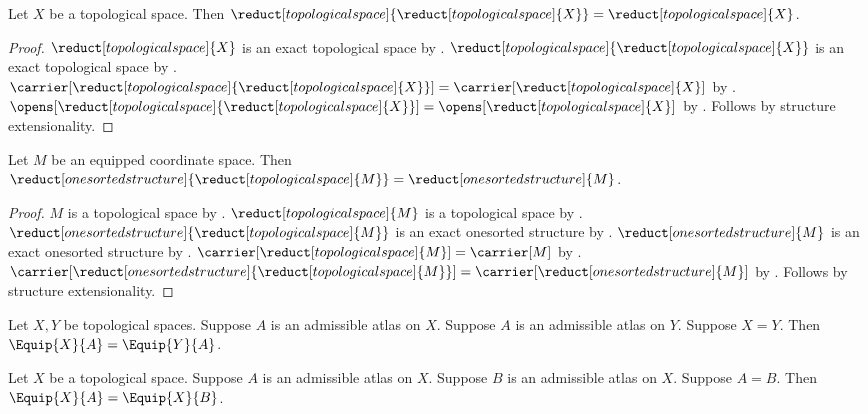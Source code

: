 \begin{proposition}\label{topological_reduct_idempotent}
    Let $X$ be a topological space.
    Then $\reduct[topological space]{\reduct[topological space]{X}}=\reduct[topological space]{X}$.
\end{proposition}
\begin{proof}
    $\reduct[topological space]{X}$ is an exact topological space
        by .
    $\reduct[topological space]{\reduct[topological space]{X}}$ is an exact topological space
        by .
    $\carrier[\reduct[topological space]{\reduct[topological space]{X}}]=
        \carrier[\reduct[topological space]{X}]$
        by .
    $\opens[\reduct[topological space]{\reduct[topological space]{X}}]=
        \opens[\reduct[topological space]{X}]$
        by .
    Follows by structure extensionality.
\end{proof}

\begin{proposition}\label{underlying_carrier_reduct_composition}
    Let $M$ be an equipped coordinate space.
    Then $\reduct[onesorted structure]{\reduct[topological space]{M}}=
        \reduct[onesorted structure]{M}$.
\end{proposition}
\begin{proof}
    $M$ is a topological space by .
    $\reduct[topological space]{M}$ is a topological space by .
    $\reduct[onesorted structure]{\reduct[topological space]{M}}$ is an exact onesorted structure
        by .
    $\reduct[onesorted structure]{M}$ is an exact onesorted structure
        by .
    $\carrier[\reduct[topological space]{M}]=\carrier[M]$
        by .
    $\carrier[\reduct[onesorted structure]{\reduct[topological space]{M}}]=
        \carrier[\reduct[onesorted structure]{M}]$
        by .
    Follows by structure extensionality.
\end{proof}

\begin{proposition}\label{equip_space_congruence}
    Let $X,Y$ be topological spaces.
    Suppose $A$ is an admissible atlas on $X$.
    Suppose $A$ is an admissible atlas on $Y$.
    Suppose $X=Y$.
    Then $\Equip{X}{A}=\Equip{Y}{A}$.
\end{proposition}

\begin{proposition}\label{equip_atlas_congruence}
    Let $X$ be a topological space.
    Suppose $A$ is an admissible atlas on $X$.
    Suppose $B$ is an admissible atlas on $X$.
    Suppose $A=B$.
    Then $\Equip{X}{A}=\Equip{X}{B}$.
\end{proposition}
